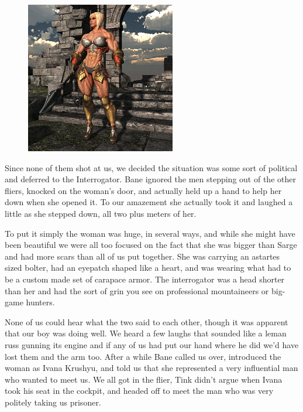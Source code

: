 \begin{figure}
	\begin{center}
		\includegraphics[width=\figwidth]{pics/9/36.png}
	\end{center}
\end{figure}
Since none of them shot at us, we decided the situation was some sort of political and deferred to the Interrogator. 
Bane ignored the men stepping out of the other fliers, knocked on the woman's door, and actually held up a hand to help her down when she opened it. 
To our amazement she actually took it and laughed a little as she stepped down, all two plus meters of her.

To put it simply the woman was huge, in several ways, and while she might have been beautiful we were all too focused on the fact that she was bigger than Sarge and had more scars than all of us put together. 
She was carrying an astartes sized bolter, had an eyepatch shaped like a heart, and was wearing what had to be a custom made set of carapace armor. 
The interrogator was a head shorter than her and had the sort of grin you see on professional mountaineers or big-game hunters.

None of us could hear what the two said to each other, though it was apparent that our boy was doing well. 
We heard a few laughs that sounded like a leman russ gunning its engine and if any of us had put our hand where he did we'd have lost them and the arm too. 
After a while Bane called us over, introduced the woman as Ivana Krushyu, and told us that she represented a very influential man who wanted to meet us. 
We all got in the flier, Tink didn't argue when Ivana took his seat in the cockpit, and headed off to meet the man who was very politely taking us prisoner.

